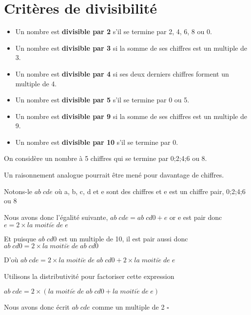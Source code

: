 \section{Critères de divisibilité}
\begin{propriete}[\admise]	
	\begin{itemize}
		\item Un nombre est \textbf{divisible par 2} s'il se termine par 2, 4, 6, 8 ou 0.
		\item Un nombre est \textbf{divisible par 3} si la somme de ses chiffres est un multiple de 3.
		\item Un nombre est \textbf{divisible par 4} si ses deux derniers chiffres forment un multiple de 4.
		\item Un nombre est \textbf{divisible par 5} s'il se termine par 0 ou 5.
		\item Un nombre est \textbf{divisible par 9} si la somme de ses chiffres est un multiple de 9.
		\item Un nombre est \textbf{divisible par 10} s'il se termine par 0.
	\end{itemize}
\end{propriete}
\renewcommand{\StringPREUVE}{\textsc{Idée de la preuve du critère de divisibilité par 2}}
\begin{preuve}

	On considère un nombre à 5 chiffres qui se termine par 0;2;4;6 ou 8.

	Un raisonnement analogue pourrait être mené pour davantage de chiffres.
	
	Notons-le $ab\;cde$ où a, b, c, d et e sont des chiffres et e est un chiffre pair, 0;2;4;6 ou 8
	
	Nous avons donc l'égalité suivante, $ab\;cde = ab\;cd0 + e$ or e est pair donc $e = 2\times la\;moiti\acute{e}\;de\;e$

	Et puisque $ab\;cd0$ est un multiple de 10, il est pair aussi donc $ab\;cd0 = 2\times la\;moiti\acute{e}\;de\;ab\;cd0$	
	
	D'où $ab\;cde = 2\times la\;moiti\acute{e}\;de\;ab\;cd0 + 2\times la\;moiti\acute{e}\;de\;e$
		
	Utilisons la distributivité pour factoriser cette expression

	$ab\;cde = 2\times (la\;moiti\acute{e}\;de\;ab\;cd0 + la\;moiti\acute{e}\;de\;e)$
	
	Nous avons donc écrit $ab\;cde$ comme un multiple de 2 $\square$	
\end{preuve}
\renewcommand{\StringPREUVE}{PREUVE}


